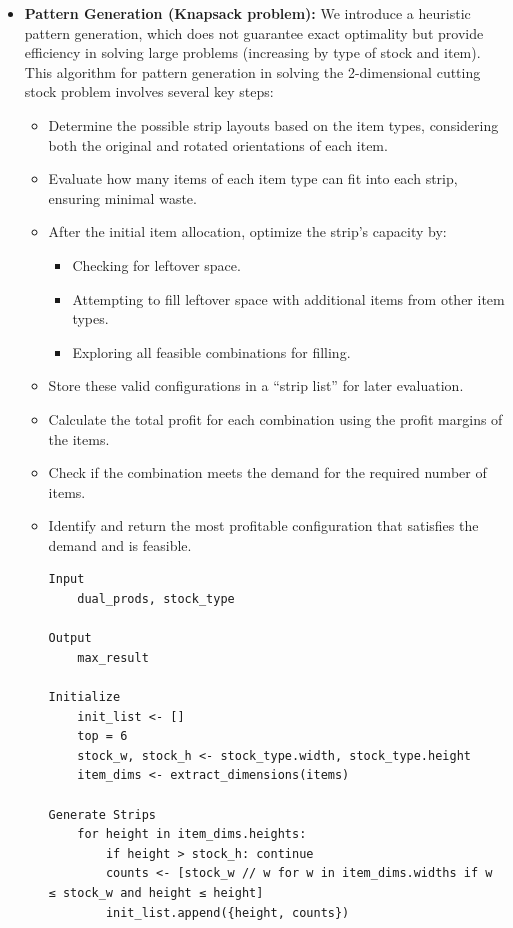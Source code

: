\documentclass[a4paper]{article}
\begin{document}
\begin{itemize}
\item \textbf{Pattern Generation (Knapsack problem): }
We introduce a heuristic pattern generation, which does not guarantee exact optimality but provide efficiency in solving large problems (increasing by type of stock and item). This algorithm for pattern generation in solving the 2-dimensional cutting stock problem involves several key steps:
\begin{itemize}
    \item Determine the possible strip layouts based on the item types, considering both the original and rotated orientations of each item.
    \item Evaluate how many items of each item type can fit into each strip, ensuring minimal waste.
    \item After the initial item allocation, optimize the strip’s capacity by:
    \begin{itemize}
        \item Checking for leftover space.
        \item Attempting to fill leftover space with additional items from other item types.
        \item Exploring all feasible combinations for filling.
    \end{itemize}
    \item Store these valid configurations in a ``strip list'' for later evaluation.
    \item Calculate the total profit for each combination using the profit margins of the items.
    \item Check if the combination meets the demand for the required number of items.
    \item Identify and return the most profitable configuration that satisfies the demand and is feasible.
    
\begin{verbatim}
Input
    dual_prods, stock_type

Output
    max_result

Initialize
    init_list <- []
    top = 6
    stock_w, stock_h <- stock_type.width, stock_type.height
    item_dims <- extract_dimensions(items)

Generate Strips
    for height in item_dims.heights:
        if height > stock_h: continue
        counts <- [stock_w // w for w in item_dims.widths if w ≤ stock_w and height ≤ height]
        init_list.append({height, counts})


\end{verbatim}
\end{itemize}
\end{itemize}
\end{document}
